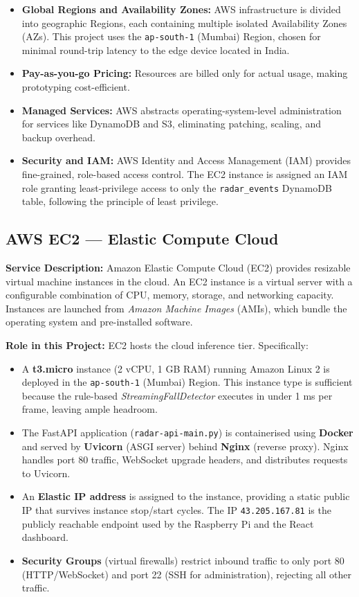 \begin{itemize}
    \item \textbf{Global Regions and Availability Zones:} AWS infrastructure is divided into geographic Regions, each containing multiple isolated Availability Zones (AZs). This project uses the \texttt{ap-south-1} (Mumbai) Region, chosen for minimal round-trip latency to the edge device located in India.
    \item \textbf{Pay-as-you-go Pricing:} Resources are billed only for actual usage, making prototyping cost-efficient.
    \item \textbf{Managed Services:} AWS abstracts operating-system-level administration for services like DynamoDB and S3, eliminating patching, scaling, and backup overhead.
    \item \textbf{Security and IAM:} AWS Identity and Access Management (IAM) provides fine-grained, role-based access control. The EC2 instance is assigned an IAM role granting least-privilege access to only the \texttt{radar\_events} DynamoDB table, following the principle of least privilege.
\end{itemize}

\subsection{AWS EC2 --- Elastic Compute Cloud}

\textbf{Service Description:} Amazon Elastic Compute Cloud (EC2) provides resizable virtual machine instances in the cloud. An EC2 instance is a virtual server with a configurable combination of CPU, memory, storage, and networking capacity. Instances are launched from \textit{Amazon Machine Images} (AMIs), which bundle the operating system and pre-installed software.

\textbf{Role in this Project:} EC2 hosts the cloud inference tier. Specifically:

\begin{itemize}
    \item A \textbf{t3.micro} instance (2 vCPU, 1 GB RAM) running Amazon Linux 2 is deployed in the \texttt{ap-south-1} (Mumbai) Region. This instance type is sufficient because the rule-based \textit{StreamingFallDetector} executes in under 1 ms per frame, leaving ample headroom.
    \item The FastAPI application (\texttt{radar-api-main.py}) is containerised using \textbf{Docker} and served by \textbf{Uvicorn} (ASGI server) behind \textbf{Nginx} (reverse proxy). Nginx handles port 80 traffic, WebSocket upgrade headers, and distributes requests to Uvicorn.
    \item An \textbf{Elastic IP address} is assigned to the instance, providing a static public IP that survives instance stop/start cycles. The IP \texttt{43.205.167.81} is the publicly reachable endpoint used by the Raspberry Pi and the React dashboard.
    \item \textbf{Security Groups} (virtual firewalls) restrict inbound traffic to only port 80 (HTTP/WebSocket) and port 22 (SSH for administration), rejecting all other traffic.
\end{itemize}

